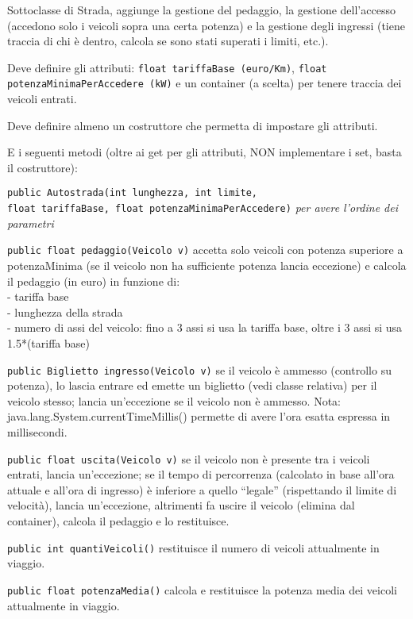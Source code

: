 \documentclass[a4paper,12pt]{article}
\begin{document}
Sottoclasse di Strada, aggiunge la gestione del pedaggio,
la gestione dell'accesso (accedono 
solo i veicoli sopra una certa potenza) e la gestione degli ingressi (tiene 
traccia di chi è dentro, calcola se sono stati superati i limiti, etc.).

Deve definire gli attributi: \texttt{float tariffaBase (euro/Km)},
 \texttt{float 
potenzaMinimaPerAccedere (kW)} e un container (a scelta) per tenere traccia dei veicoli 
entrati.

Deve definire almeno un costruttore che permetta di impostare gli attributi.

E i seguenti metodi (oltre ai get per gli attributi, NON implementare i set, 
basta il costruttore):

\begin{compactitem}

\item\texttt{public Autostrada(int lunghezza, int limite,\\
float tariffaBase, float potenzaMinimaPerAccedere)} \textit{per avere l'ordine dei parametri}


\item \texttt{public float pedaggio(Veicolo v)} accetta solo veicoli con potenza superiore a potenzaMinima (se il veicolo non ha sufficiente potenza lancia eccezione) e 
calcola il pedaggio (in euro) in funzione di:\\
- tariffa base\\
- lunghezza della strada\\
- numero di assi del veicolo: fino a 3 assi si usa la tariffa base, oltre i 3 assi si usa 1.5*(tariffa base)

\item \texttt{public Biglietto ingresso(Veicolo v)} se il veicolo è ammesso
(controllo su potenza), lo lascia entrare ed emette un biglietto (vedi classe relativa) per il 
veicolo stesso; lancia un'eccezione se il veicolo non è ammesso.
Nota: java.lang.System.currentTimeMillis() permette di avere l'ora esatta espressa 
in millisecondi.

\item \texttt{public float uscita(Veicolo v)} se il veicolo non è presente tra 
i veicoli entrati, lancia un'eccezione; se il tempo di percorrenza (calcolato in base
all'ora attuale e all'ora di ingresso) è inferiore a 
quello ``legale'' (rispettando il limite di velocità), lancia un'eccezione,
altrimenti fa uscire il veicolo (elimina dal container), calcola il pedaggio e lo restituisce.


\item \texttt{public int quantiVeicoli()} restituisce il numero di veicoli 
attualmente in viaggio.

\item \texttt{public float potenzaMedia()} calcola e restituisce la potenza 
media dei veicoli attualmente in viaggio.



\end{compactitem} 
\end{document}
